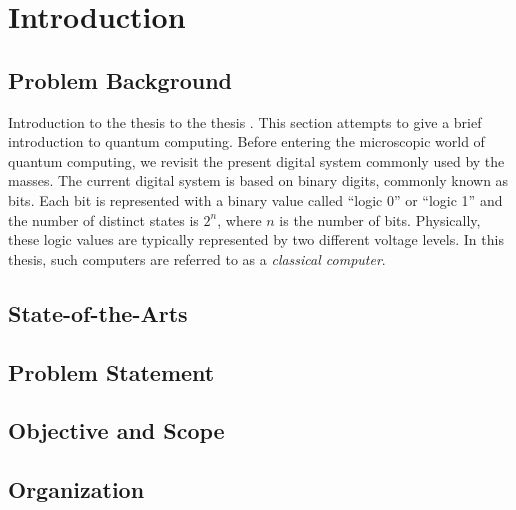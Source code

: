 \chapter{Introduction}
\label{chap:intro}
\section{Problem Background}
Introduction to the thesis \cite{b2} to the thesis \cite{okamoto2004improved}. This section attempts to give a brief introduction to quantum computing. Before entering the microscopic world of quantum computing, we revisit the present digital system commonly used by the masses.  The current digital system is based on binary digits, commonly known as bits.  Each bit is represented with a binary value called ``logic 0'' or ``logic 1'' and the number of distinct states is $2^n$, where $n$ is the number of bits.  Physically, these logic values are typically represented by two different voltage levels. In this thesis, such computers are referred to as a \emph{classical computer}.
\section{State-of-the-Arts}
\section{Problem Statement}
\section{Objective and Scope}
\section{Organization}